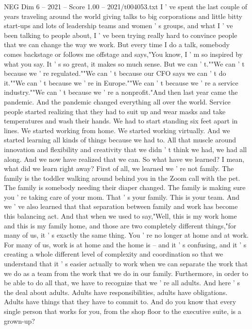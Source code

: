 \begin{textsample}{NEG Dim 6 – 2021 – Score 1.00 – 2021/t004053.txt}  \label{ex:f6_neg_003}
I ' ve spent the last couple of years traveling around the world giving talks to big corporations and little bitty start-ups and lots of leadership teams and women ' s groups, and what I ' ve been talking to people about, I ' ve been trying really hard to convince people that we can change the way we work.
But every time I do a talk, somebody comes backstage or follows me offstage and says,"You know, I ' m so inspired by what you say.
It ' s so great, it makes so much sense.
But we can ' t.""We can ' t because we ' re regulated.""We can ' t because our CFO says we can ' t do it.""We can ' t because we ' re in Europe.""We can ' t because we ' re a service industry.""We can ' t because we ' re a nonprofit."And then last year came the pandemic.
And the pandemic changed everything all over the world.
Service people started realizing that they had to suit up and wear masks and take temperatures and wash their hands.
We had to start standing six feet apart in lines.
We started working from home.
We started working virtually.
And we started learning all kinds of things because we had to.
All that muscle around innovation and flexibility and creativity that we didn ' t think we had, we had all along.
And we now have realized that we can.
So what have we learned?
I mean, what did we learn right away?
First of all, we learned we ' re not family.
The family is the toddler walking around behind you in the Zoom call with the pet.
The family is somebody needing their diaper changed.
The family is making sure you ' re taking care of your mom.
That ' s your family.
This is your team.
And we ' ve also learned that that separation between family and work has become this balancing act.
And that when we used to say,"Well, this is my work home and this is my family home, and those are two completely different things,"for many of us, it ' s exactly the same thing.
You ' re no longer at home and at work.
For many of us, work is at home and the home is -- and it ' s confusing, and it ' s creating a whole different level of complexity and coordination so that we understand that it ' s easier actually to work when we can separate the work that we do as a team from the work that we do in our family.
Furthermore, in order to be able to do all that, we have to recognize that we ' re all adults.
And here ' s the deal about adults.
Adults have responsibilities, adults have obligations.
Adults have things that they have to commit to.
And do you know that every single person that works for you, from the shop floor to the executive suite, is a grown-up?

\end{textsample}
